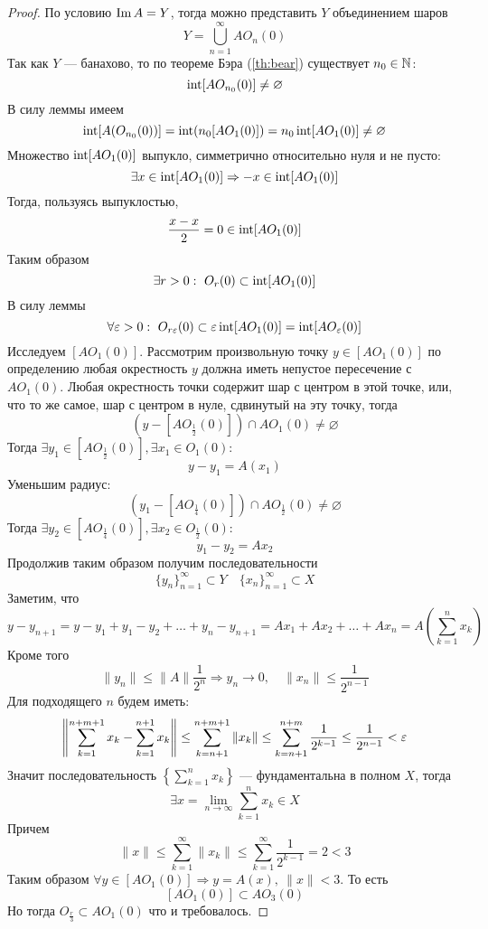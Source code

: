 \begin{proof}
	По условию $\operatorname{Im} A = Y$, тогда можно представить $Y$ объединением шаров
	$$
	Y = \bigcup_{n=1}^\infty AO_n(0)
	$$
	Так как $Y$ --- банахово, то по теореме Бэра (\ref{th:bear}) существует $n_0 \in \mathbb{N}$: 
	$$
	\operatorname{int} [AO_{n_0}(0)] \neq \varnothing
	$$
	В силу леммы имеем
	$$
	\operatorname{int} [A(O_{n_0}(0))] = \operatorname{int} (n_0 [A O_1(0)]) = n_0 \operatorname{int} [A O_1(0)] \neq \varnothing
	$$
	Множество $\operatorname{int} [A O_1(0)]$ выпукло, симметрично относительно нуля и не пусто: 
	$$
	\exists x \in \operatorname{int} [A O_1(0)] \Rightarrow -x \in \operatorname{int} [A O_1(0)]
	$$
	Тогда, пользуясь выпуклостью, 
	$$
	\frac{x - x}{2}  = 0 \in \operatorname{int} [A O_1(0)]
	$$
	Таким образом
	$$
	\exists r > 0:  \ O_r(0) \subset \operatorname{int} [A O_1(0)] 
	$$
	В силу леммы 
	$$
	\forall \varepsilon > 0 : \ O_{r\varepsilon}(0) \subset \varepsilon \operatorname{int} [A O_1(0)] = \operatorname{int} [A O_\varepsilon(0)]
	$$
	Исследуем $[A O_1(0)]$. Рассмотрим произвольную точку $y \in [A O_1(0)]$ по определению любая окрестность $y$ должна иметь непустое пересечение с $A O_1(0)$. Любая окрестность точки содержит шар с центром в этой точке, или, что то же самое, шар с центром в нуле, сдвинутый на эту точку, тогда 
	$$
	(y - [A O_{\frac{1}{2}}(0)]) \cap AO_1(0) \neq \varnothing
	$$
	Тогда $\exists y_1 \in [A O_\frac{1}{2}(0)], \exists x_1 \in O_1(0)$:
	$$
	y - y_1 = A(x_1)
	$$
	Уменьшим радиус: 
	$$
	(y_1 - [A O_{\frac{1}{4}}(0)]) \cap AO_\frac{1}{2}(0) \neq \varnothing
	$$
	Тогда $ \exists y_2 \in [A O_\frac{1}{4}(0)], \exists x_2 \in O_\frac{1}{2}(0)$: 
	$$
	y_1 - y_2 = Ax_2
	$$
	Продолжив таким образом получим последовательности 
	$$
	\{y_n\}_{n=1}^\infty \subset Y \quad \{x_n\}_{n=1}^\infty \subset X
	$$
	Заметим, что 
	$$
	y - y_{n+1} = y - y_1 + y_1 - y_2 + \dots + y_n - y_{n+1} = Ax_1 + Ax_2 + \dots + Ax_{n} = A\left(\sum_{k=1}^{n} x_k\right)
	$$
	Кроме того
	$$
	\|y_n\| \leq \|A\| \frac{1}{2^n} \Rightarrow y_n \to 0, \quad \|x_n\| \leq \frac{1}{2^{n-1}}
	$$
	Для подходящего $n$ будем иметь:
	$$
	\left\|\sum_{k=1}^{n+m+1}x_k - \sum_{k=1}^{n+1} x_k\right\| \leq \sum_{k=n+1}^{n+m+1} \|x_k\| \leq \sum_{k=n+1}^{n+m} \frac{1}{2^{k-1}}\leq \frac{1}{2^{n-1}} < \varepsilon
	$$
	Значит последовательность $\left\{\sum_{k=1}^n x_k\right\}$ --- фундаментальна в полном $X$, тогда
	$$
	\exists x = \lim\limits_{n \to \infty} \sum_{k=1}^n x_k \in X
	$$
	Причем
	$$
	\|x\| \leq \sum_{k=1}^\infty \|x_k\| \leq \sum_{k=1}^\infty \frac{1}{2^{k-1}} =2 < 3
	$$
	Таким образом $\forall y \in [AO_1(0)] \Rightarrow y = A(x), \ \|x\|  < 3$. То есть
	$$
	[AO_1(0)] \subset AO_3(0)
	$$
	Но тогда $O_\frac{r}{3} \subset AO_1(0)$ что и требовалось.
\end{proof}
